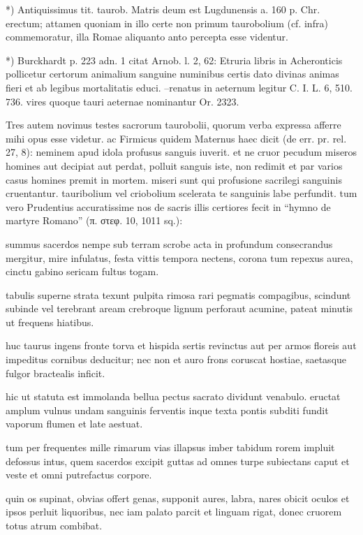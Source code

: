 \documentclass[a4paper, 11pt, oneside, polutonikogreek, german]{article}
\begin{document}
*) Antiquissimus tit. taurob. Matris deum est Lugdunensis a. 160 p. Chr. erectum; attamen quoniam in illo certe non primum taurobolium (cf. infra) commemoratur, illa Romae aliquanto anto percepta esse videntur.

*) Burckhardt p. 223 adn. 1 citat Arnob. l. 2, 62: Etruria libris in Acheronticis pollicetur certorum animalium sanguine numinibus certis dato divinas animas fieri et ab legibus mortalitatis educi. --renatus in aeternum legitur C. I. L. 6, 510. 736. vires quoque tauri aeternae nominantur Or. 2323.

Tres autem novimus testes sacrorum taurobolii, quorum verba expressa afferre mihi opus esse videtur. ac Firmicus quidem Maternus haec dicit (de err. pr. rel. 27, 8): neminem apud idola profusus sanguis iuverit. et ne cruor pecudum miseros homines aut decipiat aut perdat, polluit sanguis iste, non redimit et par varios casus homines premit in mortem. miseri sunt qui profusione sacrilegi sanguinis cruentantur. tauribolium vel criobolium scelerata te sanguinis labe perfundit. tum vero Prudentius accuratissime nos de sacris illis certiores fecit in "`hymno de martyre Romano"' (π. στεφ. 10, 1011 sq.):

summus sacerdos nempe sub terram scrobe  
acta in profundum consecrandus mergitur,  
mire infulatus, festa vittis tempora  
nectens, corona tum repexus aurea,  
cinctu gabino sericam fultus togam.

tabulis superne strata texunt pulpita  
rimosa rari pegmatis compagibus,  
scindunt subinde vel terebrant aream  
crebroque lignum perforaut acumine,  
pateat minutis ut frequens hiatibus.

huc taurus ingens fronte torva et hispida  
sertis revinctus aut per armos floreis  
aut impeditus cornibus deducitur;  
nec non et auro frons coruscat hostiae,  
saetasque fulgor bractealis inficit.

hic ut statuta est immolanda bellua  
pectus sacrato dividunt venabulo.  
eructat amplum vulnus undam sanguinis  
ferventis inque texta pontis subditi  
fundit vaporum flumen et late aestuat.

tum per frequentes mille rimarum vias  
illapsus imber tabidum rorem impluit  
defossus intus, quem sacerdos excipit  
guttas ad omnes turpe subiectans caput  
et veste et omni putrefactus corpore.

quin os supinat, obvias offert genas,  
supponit aures, labra, nares obicit  
oculos et ipsos perluit liquoribus,  
nec iam palato parcit et linguam rigat,  
donec cruorem totus atrum combibat.
\end{document}
